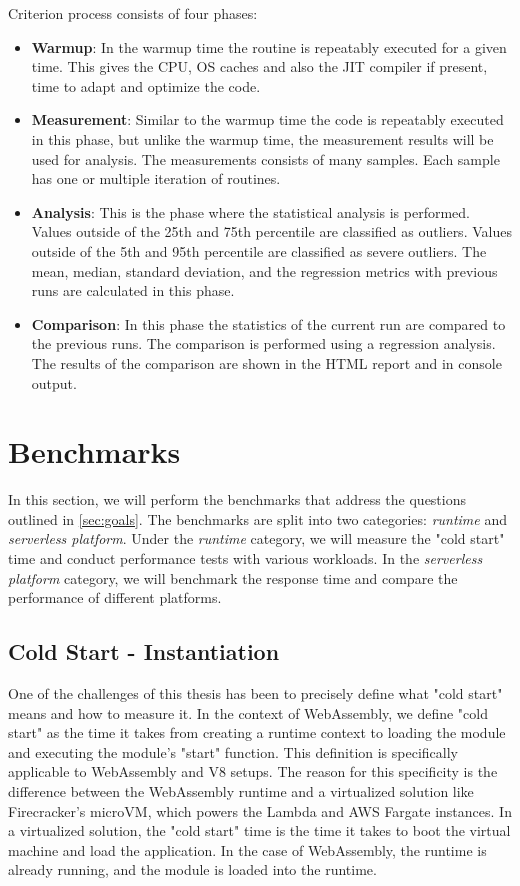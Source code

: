 Criterion process consists of four phases:

\begin{itemize}
    \item \textbf{Warmup}: In the warmup time the routine is repeatably executed for a given time. This gives the CPU, OS caches and also the JIT compiler if present, time to adapt and optimize the code.
    \item \textbf{Measurement}: Similar to the warmup time the code is repeatably executed in this phase, but unlike the warmup time, the measurement results will be used for analysis. The measurements consists of many samples. Each sample has one or multiple iteration of routines. 
    \item \textbf{Analysis}: This is the phase where the statistical analysis is performed. Values outside of the 25th and 75th percentile are classified as outliers. Values outside of the 5th and 95th percentile are classified as severe outliers. The mean, median, standard deviation, and the regression metrics with previous runs are calculated in this phase.
    \item \textbf{Comparison}: In this phase the statistics of the current run are compared to the previous runs. The comparison is performed using a regression analysis. The results of the comparison are shown in the HTML report and in console output.
\end{itemize}

\section{Benchmarks}
\label{sec:benchmarks}

In this section, we will perform the benchmarks that address the questions outlined in \autoref{sec:goals}. The benchmarks are split into two categories: \textit{runtime} and \textit{serverless platform}. Under the \textit{runtime} category, we will measure the "cold start" time and conduct performance tests with various workloads. In the \textit{serverless platform} category, we will benchmark the response time and compare the performance of different platforms.

\subsection{Cold Start - Instantiation}
\label{subsec:cold-start}

One of the challenges of this thesis has been to precisely define what "cold start" means and how to measure it. In the context of WebAssembly, we define "cold start" as the time it takes from creating a runtime context to loading the module and executing the module's "start" function. This definition is specifically applicable to WebAssembly and V8 setups. The reason for this specificity is the difference between the WebAssembly runtime and a virtualized solution like Firecracker's microVM, which powers the Lambda and AWS Fargate instances. In a virtualized solution, the "cold start" time is the time it takes to boot the virtual machine and load the application. In the case of WebAssembly, the runtime is already running, and the module is loaded into the runtime.

